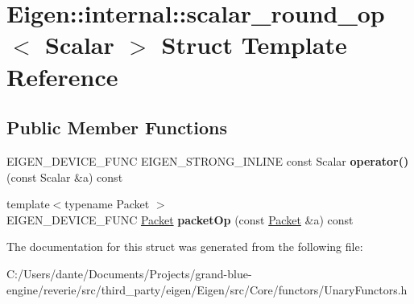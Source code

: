 \hypertarget{struct_eigen_1_1internal_1_1scalar__round__op}{}\section{Eigen\+::internal\+::scalar\+\_\+round\+\_\+op$<$ Scalar $>$ Struct Template Reference}
\label{struct_eigen_1_1internal_1_1scalar__round__op}
\subsection*{Public Member Functions}
\begin{DoxyCompactItemize}
\item 
\mbox{\label{struct_eigen_1_1internal_1_1scalar__round__op_abc322471ac5885e0437299ef98617fe1}} 
E\+I\+G\+E\+N\+\_\+\+D\+E\+V\+I\+C\+E\+\_\+\+F\+U\+NC E\+I\+G\+E\+N\+\_\+\+S\+T\+R\+O\+N\+G\+\_\+\+I\+N\+L\+I\+NE const Scalar {\bfseries operator()} (const Scalar \&a) const
\item 
\mbox{\label{struct_eigen_1_1internal_1_1scalar__round__op_a17a779a104a90ed7970d7abb38f2050b}} 
{\footnotesize template$<$typename Packet $>$ }\\E\+I\+G\+E\+N\+\_\+\+D\+E\+V\+I\+C\+E\+\_\+\+F\+U\+NC \mbox{\hyperlink{union_eigen_1_1internal_1_1_packet}{Packet}} {\bfseries packet\+Op} (const \mbox{\hyperlink{union_eigen_1_1internal_1_1_packet}{Packet}} \&a) const
\end{DoxyCompactItemize}


The documentation for this struct was generated from the following file\+:\begin{DoxyCompactItemize}
\item 
C\+:/\+Users/dante/\+Documents/\+Projects/grand-\/blue-\/engine/reverie/src/third\+\_\+party/eigen/\+Eigen/src/\+Core/functors/Unary\+Functors.\+h\end{DoxyCompactItemize}
